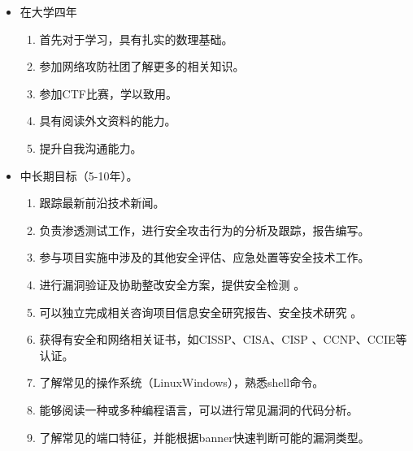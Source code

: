 \documentclass{article}
\begin{document}
\begin{itemize}
	\item 在大学四年
		\begin{enumerate}[(1)]
		\item 首先对于学习，具有扎实的数理基础。
		\item 参加网络攻防社团了解更多的相关知识。
		\item 参加CTF比赛，学以致用。
		\item 具有阅读外文资料的能力。
		\item 提升自我沟通能力。
		\end{enumerate}
	\item 中长期目标（5-10年）。
		\begin{enumerate}[(1)]
		\item 跟踪最新前沿技术新闻。
		\item 负责渗透测试工作，进行安全攻击行为的分析及跟踪，报告编写。 
		\item 参与项目实施中涉及的其他安全评估、应急处置等安全技术工作。
		\item 进行漏洞验证及协助整改安全方案，提供安全检测 。
		\item 可以独立完成相关咨询项目信息安全研究报告、安全技术研究 。
		\item 获得有安全和网络相关证书，如CISSP、CISA、CISP 、CCNP、CCIE等认证。
		\item 了解常见的操作系统（LinuxWindows），熟悉shell命令。
		\item 能够阅读一种或多种编程语言，可以进行常见漏洞的代码分析。
		\item 了解常见的端口特征，并能根据banner快速判断可能的漏洞类型。
		\end{enumerate}
\end{itemize}
\end{document}
